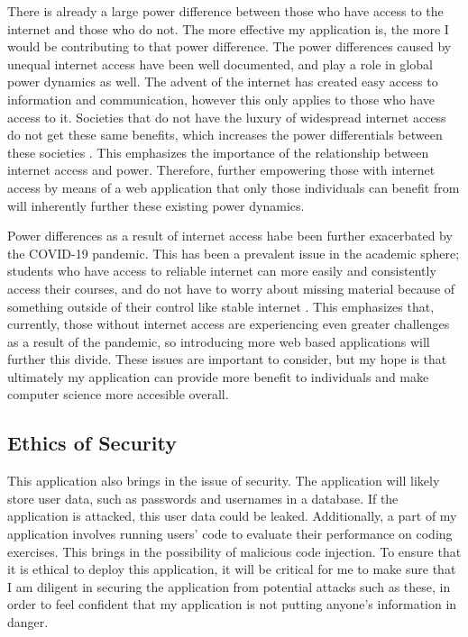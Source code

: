 \documentclass[10pt,twocolumn]{article}
\begin{document}
There is already a large power difference between those who have access to the internet 
and those who do not. The more effective my application is, the more I would be contributing to that power difference. 
The power differences caused by unequal internet access have been well documented, and play a role in global power 
dynamics as well. The advent of the internet has created easy access to information and communication, however this only 
applies to those who have access to it. Societies that do not have the luxury of widespread internet access do not get 
these same benefits, which increases the power differentials between these societies \cite{Fang2018Article}. This 
emphasizes the importance of the relationship between internet access and power. Therefore, further empowering those 
with internet access by means of a web application that only those individuals can benefit from will inherently further 
these existing power dynamics.

Power differences as a result of internet access habe been further exacerbated by the COVID-19 pandemic. This has been a 
prevalent issue in the academic sphere; students 
who have access to reliable internet can more easily and consistently access their courses, and do not have to worry 
about missing material because of something outside of their control like stable internet \cite{Lai2020Article}. 
This emphasizes that, currently, those without internet access are experiencing even greater challenges as a result of 
the pandemic, so introducing more web based applications will further this divide. These issues are important to 
consider, but my hope is that ultimately my application can provide more benefit to individuals and make computer 
science more accesible overall. 

\subsection{Ethics of Security}

This application also brings in the issue of security. The application will likely store user data, such as passwords 
and usernames in a database. If the application is attacked, this user data could be leaked. Additionally, a part of my 
application involves running users' code to evaluate their performance on coding exercises. This brings in the 
possibility of malicious code injection. To ensure that it is ethical to deploy this application, it will be critical 
for me to make sure that I am diligent in securing the 
application from potential attacks such as these, in order to feel confident that my application is not putting anyone's 
information in danger. 
\end{document}
